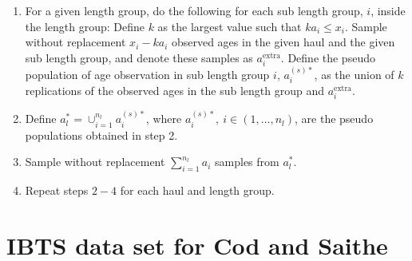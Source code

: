 \documentclass[a4paper 12pt]{article}
\numberwithin{equation}{section}
\begin{document}
\begin{enumerate}
\item For a given length group, do the following for each sub length group, $i$, inside the length group: Define $k$ as the largest value such that $ka_{i} \leq x_{i}$. Sample without replacement $x_{i} - k a_{i}$ observed ages in the given haul and the given sub length group, and denote these samples as $a^{\mathrm{extra}}_{i}$. Define the pseudo population of age observation in sub length group $i$, $a^{(s)*}_{i}$, as the union of $k$ replications of the observed ages in the sub length group and $a^{\mathrm{extra}}_{i}$.

\item Define $a^{*}_{l} = \cup_{i = 1}^{n_{l}} a^{(s)*}_{i} $, where $a^{(s)*}_{i}, \ i \in \left(1,...,n_{l} \right)$, are the pseudo populations obtained in step 2.

\item Sample without replacement $\sum_{i = 1}^{n_{l}} a_{i}$ samples from $a^{*}_{l} $.

\item Repeat steps $2-4$ for each haul and length group.
\end{enumerate}

\clearpage
\section{\large IBTS data set for Cod and Saithe}
\label{secAp:data}

\end{document}
